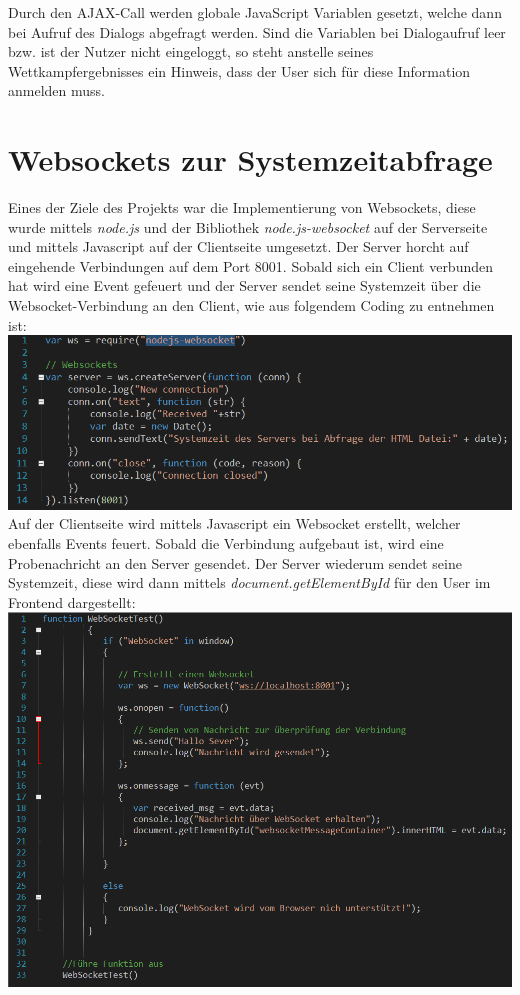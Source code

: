 Durch den AJAX-Call werden globale JavaScript Variablen gesetzt, welche dann bei Aufruf des Dialogs abgefragt werden. Sind die Variablen bei Dialogaufruf leer bzw. ist der Nutzer nicht eingeloggt, so steht anstelle seines Wettkampfergebnisses ein Hinweis, dass der User sich für diese Information anmelden muss.

\section{Websockets zur Systemzeitabfrage}
Eines der Ziele des Projekts war die Implementierung von Websockets, diese wurde mittels \textit{node.js} und der Bibliothek \textit{node.js-websocket}
auf der Serverseite und mittels Javascript auf der Clientseite umgesetzt. Der Server horcht auf eingehende Verbindungen auf dem Port 8001. Sobald sich ein Client verbunden hat wird eine Event gefeuert und der Server sendet seine Systemzeit \"uber die Websocket-Verbindung an den Client, wie aus folgendem Coding zu entnehmen ist:  
\newline
\includegraphics[width=1\textwidth]{img/vincent/abb02.png}
\newline
Auf der Clientseite wird mittels Javascript ein Websocket erstellt, welcher ebenfalls Events feuert. Sobald die Verbindung aufgebaut ist, wird eine Probenachricht an den Server gesendet. Der Server wiederum sendet seine Systemzeit, diese wird dann mittels \textit{document.getElementById} f\"ur den User im Frontend dargestellt: 
\newline
\includegraphics[width=1\textwidth]{img/vincent/abb03.png}

